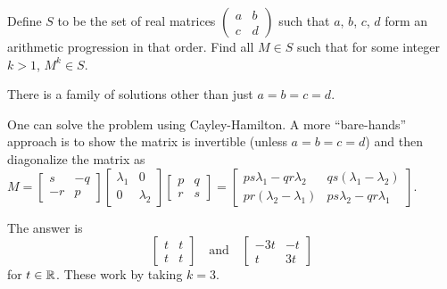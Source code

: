 \begin{problem}
	[Putnam 2015]
	\twochili
	Define $S$ to be the set of real matrices
	$\left(\begin{smallmatrix} a & b \\ c & d \end{smallmatrix}\right)$
	such that $a$, $b$, $c$, $d$ form
	an arithmetic progression in that order.
	Find all $M \in S$ such that for some integer $k > 1$, $M^k \in S$.
	\begin{hint}
		There is a family of solutions other than just $a=b=c=d$.

		One can solve the problem using Cayley-Hamilton.
		A more ``bare-hands'' approach is to
		show the matrix is invertible (unless $a=b=c=d$)
		and then diagonalize the matrix as
		$
		M =
		\begin{bmatrix} s & -q \\ -r & p \end{bmatrix}
		\begin{bmatrix} \lambda_1 & 0 \\ 0 & \lambda_2 \end{bmatrix}
		\begin{bmatrix} p & q \\ r & s \end{bmatrix}
		=
		\begin{bmatrix}
			ps\lambda_1 - qr\lambda_2 & qs(\lambda_1-\lambda_2) \\
			pr(\lambda_2-\lambda_1) & ps\lambda_2 - qr\lambda_1
		\end{bmatrix}
		$.
	\end{hint}
	\begin{sol}
		The answer is
		\[ \begin{bmatrix} t&t\\t&t \end{bmatrix}
			\quad\text{and}\quad
			\begin{bmatrix} -3t&-t\\t&3t \end{bmatrix} \]
		for $t \in \mathbb R$.
		These work by taking $k=3$.


\end{sol}
\end{problem}
